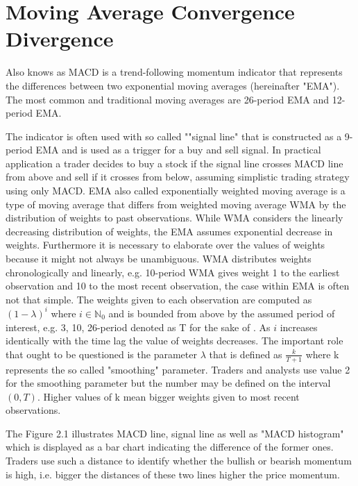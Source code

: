\section{Moving Average Convergence Divergence}

Also knows as MACD is a trend-following momentum indicator that represents the differences between two exponential moving averages (hereinafter "EMA"). The most common and traditional moving averages are 26-period EMA and 12-period EMA. 

The indicator is often used with so called ""signal line" that is constructed as a 9-period EMA and is used as a trigger for a buy and sell signal. In practical application a trader decides to buy a stock if the signal line crosses MACD line from above and sell if it crosses from below, assuming simplistic trading strategy using only MACD. EMA also called exponentially weighted moving average is a type of moving average that differs from weighted moving average WMA by the distribution of weights to past observations. While WMA considers the linearly decreasing distribution of weights, the EMA assumes exponential decrease in weights. Furthermore it is necessary to elaborate over the values of weights because it might not always be unambiguous. WMA distributes weights chronologically and linearly, e.g. 10-period WMA gives weight 1 to the earliest observation and 10 to the most recent observation, the case within EMA is often not that simple. The weights given to each observation are computed as $(1 - \lambda)^i$ where $i \in \mathbb{N}_0$ and is bounded from above by the assumed period of interest, e.g. 3, 10, 26-period denoted as T for the sake of . As $i$ increases identically with the time lag the value of weights decreases. The important role that ought to be questioned is the parameter $\lambda$ that is defined as $\frac{k}{T+1}$ where k represents the so called "smoothing" parameter. Traders and analysts use value 2 for the smoothing parameter but the number may be defined on the interval $(0,T)$. Higher values of k mean bigger weights given to most recent observations. 

The Figure 2.1 illustrates MACD line, signal line as well as "MACD histogram" which is displayed as a bar chart indicating the difference of the former ones. Traders use such a distance to identify whether the bullish or bearish momentum is high, i.e. bigger the distances of these two lines higher the price momentum.

